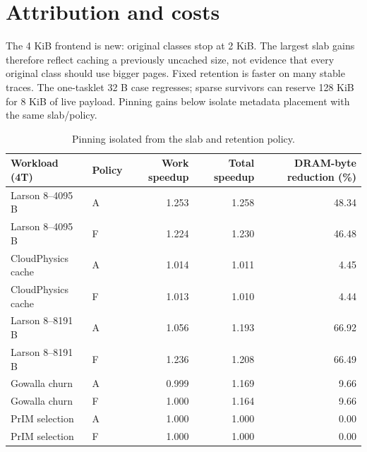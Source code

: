 \documentclass[conference,onecolumn]{IEEEtran}
\begin{document}
\section{Attribution and costs}
The 4 KiB frontend is new: original classes stop at 2 KiB. The largest slab gains therefore reflect caching a previously uncached size, not evidence that every original class should use bigger pages. Fixed retention is faster on many stable traces. The one-tasklet 32 B case regresses; sparse survivors can reserve 128 KiB for 8 KiB of live payload. Pinning gains below isolate metadata placement with the same slab/policy.
\begin{table}[!htbp]
\caption{Pinning isolated from the slab and retention policy.}\label{tab:pinning}
\centering\small
\begin{tabular}{llrrr}\toprule
Workload (4T) & Policy & Work speedup & Total speedup & DRAM-byte reduction (\%) \\ \midrule
Larson 8--4095 B & A & 1.253 & 1.258 & 48.34 \\
Larson 8--4095 B & F & 1.224 & 1.230 & 46.48 \\
CloudPhysics cache & A & 1.014 & 1.011 & 4.45 \\
CloudPhysics cache & F & 1.013 & 1.010 & 4.44 \\
Larson 8--8191 B & A & 1.056 & 1.193 & 66.92 \\
Larson 8--8191 B & F & 1.236 & 1.208 & 66.49 \\
Gowalla churn & A & 0.999 & 1.169 & 9.66 \\
Gowalla churn & F & 1.000 & 1.164 & 9.66 \\
PrIM selection & A & 1.000 & 1.000 & 0.00 \\
PrIM selection & F & 1.000 & 1.000 & 0.00 \\
\bottomrule\end{tabular}
\par\vspace{2pt}{\footnotesize The pinned variant uses a measured 540 B additional WRAM endpoint in each pair. It is an added-storage comparison, not an equal-WRAM-budget replacement experiment.}
\end{table}
\end{document}

